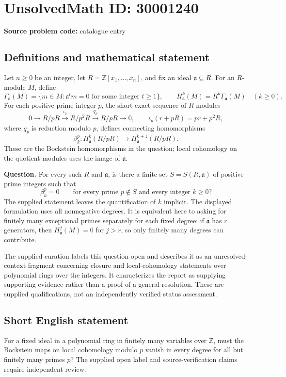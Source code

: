 \documentclass[11pt]{article}
\newcommand{\Z}{\mathbb{Z}}
\begin{document}
\section*{UnsolvedMath ID: 30001240}
\textbf{Source problem code:} catalogue entry
\subsection{Definitions and mathematical statement}
Let \(n\geq 0\) be an integer, let \(R=\Z[x_1,\ldots,x_n]\), and fix an ideal \(\mathfrak a\subseteq R\). For an \(R\)-module \(M\), define
\[
\Gamma_{\mathfrak a}(M)=\{m\in M:\mathfrak a^t m=0\text{ for some integer }t\geq 1\},
\qquad H^k_{\mathfrak a}(M)=R^k\Gamma_{\mathfrak a}(M)\quad(k\geq 0).
\]
For each positive prime integer \(p\), the short exact sequence of \(R\)-modules
\[
0\longrightarrow R/pR\xrightarrow{\iota_p}R/p^2R\xrightarrow{q_p}R/pR\longrightarrow 0,
\qquad \iota_p(r+pR)=pr+p^2R,
\]
where \(q_p\) is reduction modulo \(p\), defines connecting homomorphisms
\[
\beta_k^p:H^k_{\mathfrak a}(R/pR)\longrightarrow H^{k+1}_{\mathfrak a}(R/pR).
\]
These are the Bockstein homomorphisms in the question; local cohomology on the quotient modules uses the image of \(\mathfrak a\).

\textbf{Question.} For every such \(R\) and \(\mathfrak a\), is there a finite set \(S=S(R,\mathfrak a)\) of positive prime integers such that
\[
\beta_k^p=0\qquad\text{for every prime }p\notin S\text{ and every integer }k\geq 0?
\]
The supplied statement leaves the quantification of \(k\) implicit. The displayed formulation uses all nonnegative degrees. It is equivalent here to asking for finitely many exceptional primes separately for each fixed degree: if \(\mathfrak a\) has \(r\) generators, then \(H^j_{\mathfrak a}(M)=0\) for \(j>r\), so only finitely many degrees can contribute.

The supplied curation labels this question open and describes it as an unresolved-context fragment concerning closure and local-cohomology statements over polynomial rings over the integers. It characterizes the report as supplying supporting evidence rather than a proof of a general resolution. These are supplied qualifications, not an independently verified status assessment.
\subsection{Short English statement}
For a fixed ideal in a polynomial ring in finitely many variables over \(\Z\), must the Bockstein maps on local cohomology modulo \(p\) vanish in every degree for all but finitely many primes \(p\)? The supplied open label and source-verification claims require independent review.
\end{document}
